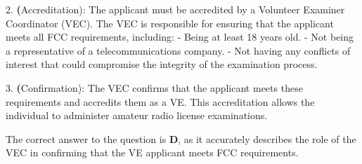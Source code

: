 2. \textbf(Accreditation): The applicant must be accredited by a Volunteer Examiner Coordinator (VEC). The VEC is responsible for ensuring that the applicant meets all FCC requirements, including:
   - Being at least 18 years old.
   - Not being a representative of a telecommunications company.
   - Not having any conflicts of interest that could compromise the integrity of the examination process.

3. \textbf(Confirmation): The VEC confirms that the applicant meets these requirements and accredits them as a VE. This accreditation allows the individual to administer amateur radio license examinations.

The correct answer to the question is \textbf{D}, as it accurately describes the role of the VEC in confirming that the VE applicant meets FCC requirements.

